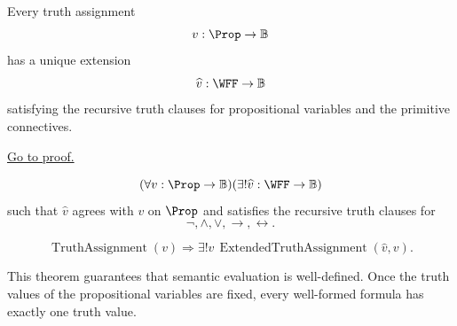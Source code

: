 \begin{tcolorbox}[colback=thmbox, colframe=thmborder, arc=2pt,
  left=6pt, right=6pt, top=4pt, bottom=4pt,
  title={\small\textbf{Theorem (Unique Extension of a Truth Assignment)}},
  fonttitle=\small\bfseries]
\begin{theorem}
\label{thm:unique-extension-truth-assignment-propositional-logic}
Every truth assignment
\[
v:\Prop\to\mathbb{B}
\]
has a unique extension
\[
\widehat v:\WFF\to\mathbb{B}
\]
satisfying the recursive truth clauses for propositional variables and the
primitive connectives.

\noindent\hyperref[prf:unique-extension-truth-assignment-propositional-logic]{Go to proof.}
\end{theorem}
\end{tcolorbox}

\begin{remark*}
\[
(\forall v:\Prop\to\mathbb{B})(\exists!\widehat v:\WFF\to\mathbb{B})
\]
such that \(\widehat v\) agrees with \(v\) on \(\Prop\) and satisfies the
recursive truth clauses for
\[
\neg,\land,\lor,\to,\leftrightarrow.
\]
\end{remark*}

\begin{remark*}
\[
\operatorname{TruthAssignment}(v)
\Longrightarrow
\exists!\widehat v\,
\operatorname{ExtendedTruthAssignment}(\widehat v,v).
\]
\end{remark*}

\begin{remark*}[Interpretation]
This theorem guarantees that semantic evaluation is well-defined. Once the
truth values of the propositional variables are fixed, every well-formed formula
has exactly one truth value.
\end{remark*}

